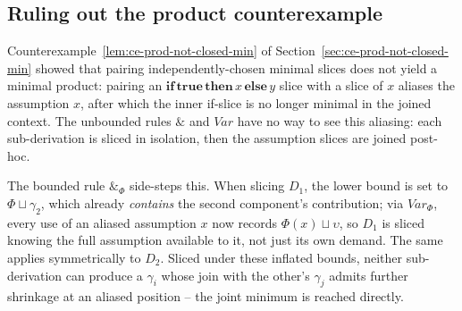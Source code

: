 \subsection*{Ruling out the product counterexample}

Counterexample~\ref{lem:ce-prod-not-closed-min} of Section~\ref{sec:ce-prod-not-closed-min} showed that pairing independently-chosen minimal slices does not yield a minimal product: pairing an $\mathbf{if}\,\mathbf{true}\,\mathbf{then}\,x\,\mathbf{else}\,y$ slice with a slice of $x$ aliases the assumption $x$, after which the inner if-slice is no longer minimal in the joined context. The unbounded rules $\&$ and $\mathit{Var}$ have no way to see this aliasing: each sub-derivation is sliced in isolation, then the assumption slices are joined post-hoc.

The bounded rule $\&_\Phi$ side-steps this. When slicing $D_1$, the lower bound is set to $\Phi \sqcup \gamma_2$, which already \textit{contains} the second component's contribution; via $\mathit{Var}_\Phi$, every use of an aliased assumption $x$ now records $\Phi(x) \sqcup \upsilon$, so $D_1$ is sliced knowing the full assumption available to it, not just its own demand. The same applies symmetrically to $D_2$. Sliced under these inflated bounds, neither sub-derivation can produce a $\gamma_i$ whose join with the other's $\gamma_j$ admits further shrinkage at an aliased position -- the joint minimum is reached directly.


